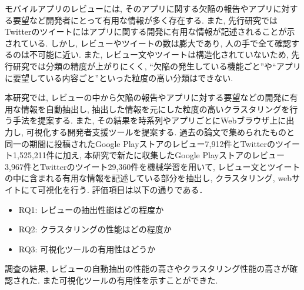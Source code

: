 
モバイルアプリのレビューには, そのアプリに関する欠陥の報告やアプリに対する要望など開発者にとって有用な情報が多く存在する. また, 先行研究ではTwitterのツイートにはアプリに関する開発に有用な情報が記述されることが示されている. しかし, レビューやツイートの数は膨大であり, 人の手で全て確認するのは不可能に近い. 
また, レビュー文やツイートは構造化されていないため, 先行研究では分類の精度が上がりにくく, ``欠陥の発生している機能ごと''や``アプリに要望している内容ごと''といった粒度の高い分類はできない. 

本研究では, レビューの中から欠陥の報告やアプリに対する要望などの開発に有用な情報を自動抽出し, 抽出した情報を元にした粒度の高いクラスタリングを行う手法を提案する. また, その結果を時系列やアプリごとにWebブラウザ上に出力し, 可視化する開発者支援ツールを提案する.
過去の論文で集められたものと同一の期間に投稿されたGoogle Playストアのレビュー7,912件とTwitterのツイート1,525,211件に加え, 本研究で新たに収集したGoogle Playストアのレビュー3,967件とTwitterのツイート29,360件を機械学習を用いて, レビュー文とツイートの中に含まれる有用な情報を記述している部分を抽出し, クラスタリング, webサイトにて可視化を行う. 評価項目は以下の通りである．
\begin{itemize}
    \item RQ1: レビューの抽出性能はどの程度か
    \item RQ2: クラスタリングの性能はどの程度か
    \item RQ3: 可視化ツールの有用性はどうか
\end{itemize}

調査の結果, レビューの自動抽出の性能の高さやクラスタリング性能の高さが確認された. また可視化ツールの有用性を示すことができた. 
